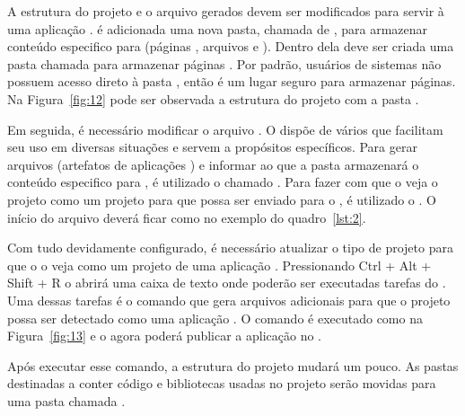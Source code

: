 
A estrutura do projeto e o arquivo  gerados devem ser modificados para servir à uma aplicação . é adicionada uma nova pasta, chamada de , para armazenar conteúdo especifico para  (páginas , arquivos  e ). Dentro dela deve ser criada uma pasta chamada  para armazenar páginas . Por padrão, usuários de sistemas   não possuem acesso direto à pasta , então é um lugar seguro para armazenar páginas. Na Figura~\ref{fig:12} pode ser observada a estrutura do projeto com a pasta .


Em seguida, é necessário modificar o arquivo . O  dispõe de vários  que facilitam seu uso em diversas situações e servem a propósitos específicos. Para gerar arquivos  (artefatos de aplicações ) e informar ao  que a pasta  armazenará o conteúdo especifico para , é utilizado o  chamado . Para fazer com que o  veja o projeto como um projeto para  que possa ser enviado para o , é utilizado o  . O início do arquivo  deverá ficar como no exemplo do quadro~\ref{lst:2}.


Com tudo devidamente configurado, é necessário atualizar o tipo de projeto para que o  o veja como um projeto de uma aplicação . Pressionando Ctrl + Alt + Shift + R o  abrirá uma caixa de texto onde poderão ser executadas tarefas do . Uma dessas tarefas é o comando  que gera arquivos adicionais para que o projeto possa ser detectado como uma aplicação . O comando é executado como na Figura~\ref{fig:13} e o  agora poderá publicar a aplicação no .


Após executar esse comando, a estrutura do projeto mudará um pouco. As pastas destinadas a conter código  e bibliotecas usadas no projeto serão movidas para uma pasta chamada .

